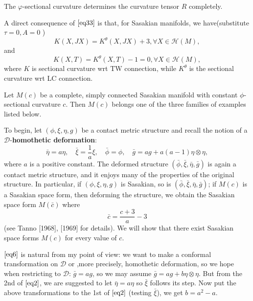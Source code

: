 \begin{remark}
    The $\varphi$-sectional curvature determines the curvature tensor $R$ completely.
\end{remark}

\begin{remark}
    A direct consequence of $\eqref{eq33}$ is that, for Sasakian manifolds, we have(substitute $\tau=0, A=0$ )
    \begin{equation}
        K(X, JX)=K^{\theta}(X,JX)+3, \forall X \in \mathcal{H}(M),
    \end{equation}
    and 
    \begin{equation}
        K(X, T)=K^{\theta}(X,T)-1=0, \forall X \in \mathcal{H}(M),
    \end{equation}
    where $K$ is sectional curvature wrt TW connection, while $K^{\theta}$ is the sectional curvature wrt LC connection.
\end{remark}

\begin{theorem}
     Let $M(c)$ be a complete, simply connected Sasakian manifold with constant $\phi$-sectional curvature $c$. Then $M(c)$ belongs one of the three families of examples listed below.
\end{theorem}

To begin, let $(\phi, \xi, \eta, g)$ be a contact metric structure and recall the notion of a $\mathcal{D}$-\textbf{homothetic deformation}:
\begin{equation}\label{eq6}
    \bar{\eta}=a \eta, \quad \bar{\xi}=\frac{1}{a} \xi, \quad \bar{\phi}=\phi, \quad \bar{g}=a g+a(a-1) \eta \otimes \eta,
\end{equation}
where $a$ is a positive constant. The deformed structure $(\bar{\phi}, \bar{\xi}, \bar{\eta}, \bar{g})$ is again a contact metric structure, and it enjoys many of the properties of the original structure. In particular, if $(\phi, \xi, \eta, g)$ is Sasakian, so is $(\bar{\phi}, \bar{\xi}, \bar{\eta}, \bar{g})$; if $M(c)$ is a Sasakian space form, then deforming the structure, we obtain the Sasakian space form $M(\bar{c})$ where $$\bar{c}=\frac{c+3}{a}-3$$ (see Tanno [1968], [1969] for details). We will show that there exist Sasakian space forms $M(c)$ for every value of $c$. 

\begin{remark}
    $\eqref{eq6}$ is natural from my point of view: we want to make a conformal transformation on $\mathcal{D}$ or ,more precisely, homothetic deformation,  so we hope when restricting to $\mathcal{D}$: $\bar{g}=ag$, so we may assume $\bar{g}=ag+b\eta\otimes \eta.$ But from the 2nd of $\eqref{eq2}$, we are suggested to let $\bar{\eta}=a\eta$ so $\bar{\xi}$ follows its step. Now put the above transformations to the 1st of $\eqref{eq2}$ (testing $\bar{\xi}$), we get $b=a^2-a$.
\end{remark}

